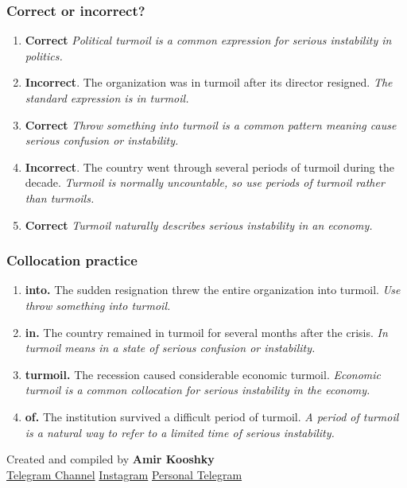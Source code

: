 \documentclass[11pt]{article}
\begin{document}
\subsubsection{Correct or incorrect?}
\begin{enumerate}
  \item \textbf{Correct} \emph{Political turmoil is a common expression for serious instability in politics.}
  \item \textbf{Incorrect}. The organization was in turmoil after its director resigned. \emph{The standard expression is in turmoil.}
  \item \textbf{Correct} \emph{Throw something into turmoil is a common pattern meaning cause serious confusion or instability.}
  \item \textbf{Incorrect}. The country went through several periods of turmoil during the decade. \emph{Turmoil is normally uncountable, so use periods of turmoil rather than turmoils.}
  \item \textbf{Correct} \emph{Turmoil naturally describes serious instability in an economy.}
\end{enumerate}

\subsubsection{Collocation practice}
\begin{enumerate}
  \item \textbf{into.} The sudden resignation threw the entire organization into turmoil. \emph{Use throw something into turmoil.}
  \item \textbf{in.} The country remained in turmoil for several months after the crisis. \emph{In turmoil means in a state of serious confusion or instability.}
  \item \textbf{turmoil.} The recession caused considerable economic turmoil. \emph{Economic turmoil is a common collocation for serious instability in the economy.}
  \item \textbf{of.} The institution survived a difficult period of turmoil. \emph{A period of turmoil is a natural way to refer to a limited time of serious instability.}
\end{enumerate}

\vfill
\begin{center}
\small\color{Muted} Created and compiled by \textbf{Amir Kooshky}\\
\href{https://t.me/KooshkyTOEFL}{Telegram Channel}\quad\textbullet\quad
\href{https://www.instagram.com/kooshkytoefl}{Instagram}\quad\textbullet\quad
\href{https://t.me/KooshkyTOEFL\_pv}{Personal Telegram}
\end{center}
\end{document}
